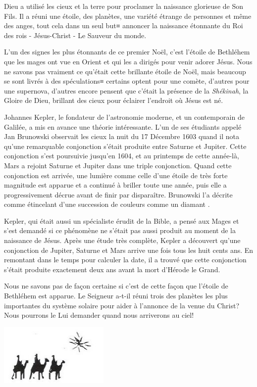 


Dieu a utilisé les cieux et la terre pour proclamer la naissance glorieuse de Son Fils. Il a réuni une étoile, des planètes, une variété étrange de personnes et même des anges, tout cela dans un seul but≡ annoncer la naissance étonnante du Roi des rois - Jésus-Christ - Le Sauveur du monde.

L'un des signes les plus étonnants de ce premier Noël, c'est l'étoile de Bethléhem que les mages ont vue en Orient et qui les a dirigés pour venir adorer Jésus. Nous ne savons pas vraiment ce qu'était cette brillante étoile de Noël, mais beaucoup se sont livrés à des spéculations≡ certains optent pour une comète, d'autres pour une supernova, d'autres encore pensent que c'était la présence de la \emph{Shékinah}, la Gloire de Dieu, brillant des cieux pour éclairer l'endroit où Jésus est né.

Johannes Kepler, le fondateur de l'astronomie moderne, et un contemporain de Galilée, a mis en avance une théorie intéressante. L'un de ses étudiants appelé Jan Brunowski observait les cieux la nuit du 17 Décembre 1603 quand il nota qu'une remarquable conjonction s'était produite entre Saturne et Jupiter. Cette conjonction s'est poursuivie jusqu'en 1604, et au printemps de cette année-là, Mars a rejoint Saturne et Jupiter dans une triple conjonction. Quand cette conjonction est arrivée, une lumière comme celle d'une étoile de très forte magnitude est apparue et a continué à briller toute une année, puis elle a progressivement décrue avant de finir par disparaître. Brunowski l'a décrite comme \og étincelant d'une succession de couleurs comme un diamant \fg{}.

Kepler, qui était aussi un spécialiste érudit de la Bible, a pensé aux Mages et s'est demandé si ce phénomène ne s'était pas aussi produit au moment de la naissance de Jésus. Après une étude très complète, Kepler a découvert qu'une conjonction de Jupiter, Saturne et Mars arrive une fois tous les huit cents ans. En remontant dans le temps pour calculer la date, il a trouvé que cette conjonction s'était produite exactement deux ans avant la mort d'Hérode le Grand.

Nous ne savons pas de façon certaine si c'est de cette façon que l'étoile de Bethléhem est apparue. Le Seigneur a-t-il réuni trois des planètes les plus importantes du système solaire pour aider à l'annonce de la venue du Christ? Nous pourrons le Lui demander quand nous arriverons au ciel!


\mbox{}\hfill\includegraphics[height=3cm]{images/3kings_star.png}\hfill\mbox{}

